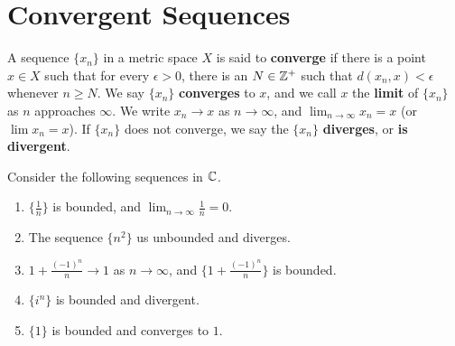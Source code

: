 
\section{Convergent Sequences}

\begin{definition}
    A sequence $\{x_n\}$ in a metric space  $X$ is said to \textbf{converge} if there is 
    a point $x \in X$ such that for every  $\epsilon>0$, there is an  $ N \in \mathbb{Z}^+$ such that 
    $d(x_n,x)<\epsilon$ whenever $n \geq N$. We say $\{x_n\}$ \textbf{converges} to $x$, and we 
    call  $x$ the \textbf{limit} of  $\{x_n\}$ as  $n$ approaches  $\infty$. We write
    $x_n \rightarrow x$ as $n \rightarrow \infty$, and  $\lim_{n \rightarrow \infty}{x_n}=x$  (or $\lim{x_n}=x$).
    If $\{x_n\}$ does not converge, we say the  $\{x_n\}$ \textbf{diverges}, or \textbf{is divergent}.
\end{definition}

\begin{example}
    Consider the following sequences in $\mathbb{C}$.
        \begin{enumerate}[label=(\arabic*)]
            \item $\{\frac{1}{n}\}$ is bounded, and $\lim_{n \rightarrow \infty}{ \frac{1}{n}}=0$.

            \item The sequence $\{n^2\}$ us unbounded and diverges.

            \item $1+\frac{(-1)^n}{n} \rightarrow 1$ as $n \rightarrow \infty$, and  $\{1+\frac{(-1)^n}{n}\}$ is bounded.

            \item $\{i^n\}$ is bounded and divergent.

            \item  $\{1\}$ is bounded and converges to  $1$.
        \end{enumerate}
\end{example}


